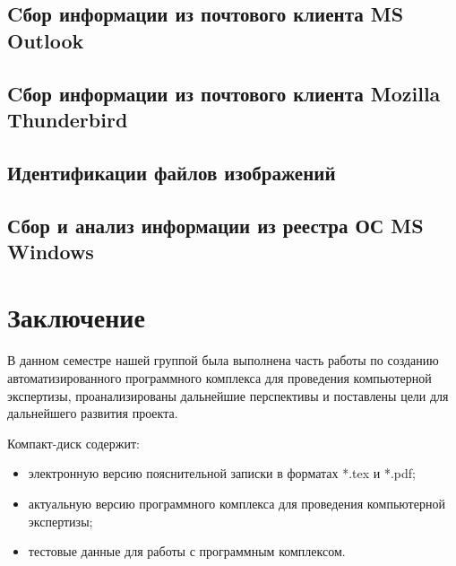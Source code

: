 \newpage
\subsection{Cбор информации из почтового клиента MS Outlook} %


\newpage
\subsection{Cбор информации из почтового клиента Mozilla Thunderbird}  %


\newpage
\subsection{Идентификации файлов изображений} 


\newpage 
\subsection{Сбор и анализ информации из реестра ОС MS Windows}


\newpage
\section*{Заключение}
В данном семестре нашей группой была выполнена часть работы по созданию автоматизированного программного комплекса для проведения компьютерной экспертизы, проанализированы дальнейшие перспективы и поставлены цели для дальнейшего развития проекта.
 
 
 \newpage
 \renewcommand{\refname}{Список использованных источников}
 

 Компакт-диск содержит: 
 \begin{itemize}
 \item электронную версию пояснительной записки в форматах *.tex и *.pdf;
 \item актуальную версию программного комплекса для проведения компьютерной экспертизы;
 \item тестовые данные для работы с программным комплексом.
 \end{itemize}
 

